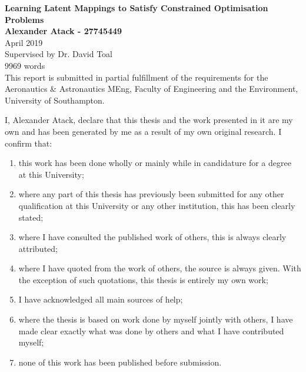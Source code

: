 \documentclass[11pt]{report}
\begin{document}
\begin{titlepage}
    \begin{center}
        \vspace*{1cm}
        \Huge\textbf{Learning Latent Mappings to Satisfy Constrained Optimisation Problems}
        \vspace{1.5cm}
        \\\Large\textbf{Alexander Atack - 27745449}
        \\\Large{April 2019}
        \vspace{1.5cm}
        \\\Large{Supervised by Dr. David Toal}
        \\\Large{9969 words}
        \vspace{1.5cm}
        \\\small{This report is submitted in partial fulfillment of the requirements for the Aeronautics \& Astronautics MEng, Faculty of Engineering and the Environment, University of Southampton.}
        \vspace{1.5cm}
    \end{center}
    \small{
        I, Alexander Atack, declare that this thesis and the work presented in it are my own and has been generated by me as a result of my own original research.
        I confirm that:
        \begin{enumerate}
            \item this work has been done wholly or mainly while in candidature for a degree at this University;
            \item where any part of this thesis has previously been submitted for any other qualification at this University or any other institution, this has been clearly stated;
            \item where I have consulted the published work of others, this is always clearly attributed;
            \item where I have quoted from the work of others, the source is always given. With the exception of such quotations, this thesis is entirely my own work;
            \item I have acknowledged all main sources of help;
            \item where the thesis is based on work done by myself jointly with others, I have made clear exactly what was done by others and what I have contributed myself;
            \item none of this work has been published before submission.
        \end{enumerate}
    }
\end{titlepage}
\end{document}
